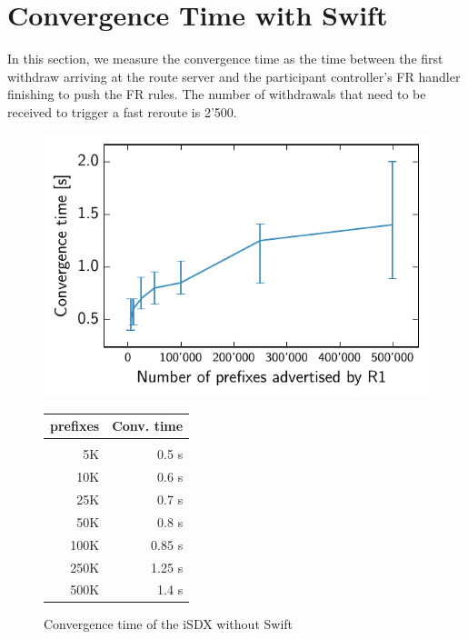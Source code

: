 \section{\label{chapter5:Convergence time with Swift}Convergence Time with Swift}

In this section, we measure the convergence time as the time between the first withdraw arriving at the route server and the participant controller's FR handler finishing to push the FR rules. The number of withdrawals that need to be received to trigger a fast reroute is 2'500.

\begin{figure}[h]
\centering
\begin{minipage}[t]{.4\textwidth}
\centering
\vspace{0pt}
\includegraphics[scale = 1]{Figures/swift.pdf}
\end{minipage}\hfill
\begin{minipage}[t]{.4\textwidth}
\centering
\vspace{0pt}
\begin{tabular}{@{}rr@{}}
	\\
	prefixes & Conv. time \\
	\hline
	\\
    5K & 0.5 s  \\
    10K & 0.6 s   \\
    25K & 0.7 s   \\
    50K & 0.8 s  \\
    100K & 0.85 s \\
    250K & 1.25 s   \\
    500K & 1.4 s  \\
\end{tabular}
\end{minipage}
\caption{Convergence time of the iSDX without Swift}
\label{fig:withswift}
\end{figure}

